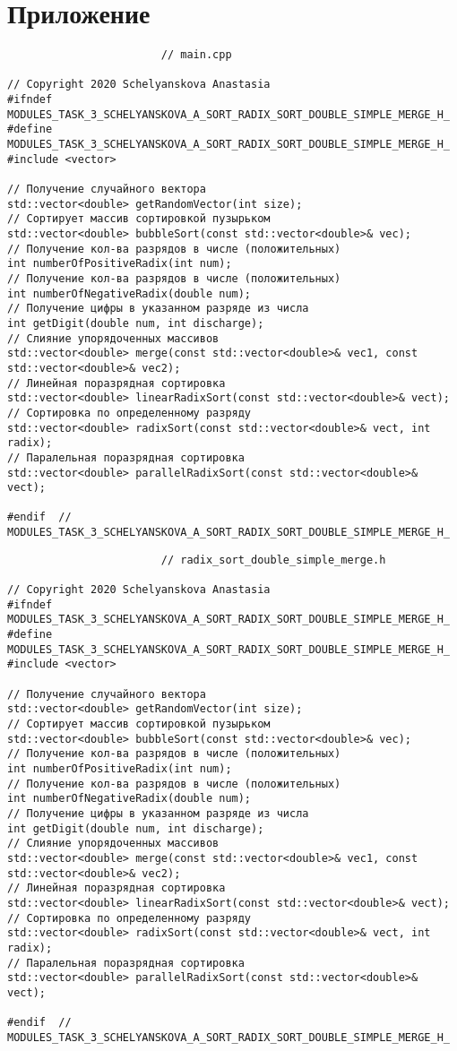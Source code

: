 \documentclass{report}
\begin{document}
\section*{Приложение}
\begin{lstlisting}
						// main.cpp

// Copyright 2020 Schelyanskova Anastasia
#ifndef MODULES_TASK_3_SCHELYANSKOVA_A_SORT_RADIX_SORT_DOUBLE_SIMPLE_MERGE_H_
#define MODULES_TASK_3_SCHELYANSKOVA_A_SORT_RADIX_SORT_DOUBLE_SIMPLE_MERGE_H_
#include <vector>

// Получение случайного вектора
std::vector<double> getRandomVector(int size);
// Сортирует массив сортировкой пузырьком
std::vector<double> bubbleSort(const std::vector<double>& vec);
// Получение кол-ва разрядов в числе (положительных)
int numberOfPositiveRadix(int num);
// Получение кол-ва разрядов в числе (положительных)
int numberOfNegativeRadix(double num);
// Получение цифры в указанном разряде из числа
int getDigit(double num, int discharge);
// Слияние упорядоченных массивов
std::vector<double> merge(const std::vector<double>& vec1, const std::vector<double>& vec2);
// Линейная поразрядная сортировка
std::vector<double> linearRadixSort(const std::vector<double>& vect);
// Сортировка по определенному разряду
std::vector<double> radixSort(const std::vector<double>& vect, int radix);
// Паралельная поразрядная сортировка
std::vector<double> parallelRadixSort(const std::vector<double>& vect);

#endif  // MODULES_TASK_3_SCHELYANSKOVA_A_SORT_RADIX_SORT_DOUBLE_SIMPLE_MERGE_H_
\end{lstlisting}
\begin{lstlisting}
						// radix_sort_double_simple_merge.h

// Copyright 2020 Schelyanskova Anastasia
#ifndef MODULES_TASK_3_SCHELYANSKOVA_A_SORT_RADIX_SORT_DOUBLE_SIMPLE_MERGE_H_
#define MODULES_TASK_3_SCHELYANSKOVA_A_SORT_RADIX_SORT_DOUBLE_SIMPLE_MERGE_H_
#include <vector>

// Получение случайного вектора
std::vector<double> getRandomVector(int size);
// Сортирует массив сортировкой пузырьком
std::vector<double> bubbleSort(const std::vector<double>& vec);
// Получение кол-ва разрядов в числе (положительных)
int numberOfPositiveRadix(int num);
// Получение кол-ва разрядов в числе (положительных)
int numberOfNegativeRadix(double num);
// Получение цифры в указанном разряде из числа
int getDigit(double num, int discharge);
// Слияние упорядоченных массивов
std::vector<double> merge(const std::vector<double>& vec1, const std::vector<double>& vec2);
// Линейная поразрядная сортировка
std::vector<double> linearRadixSort(const std::vector<double>& vect);
// Сортировка по определенному разряду
std::vector<double> radixSort(const std::vector<double>& vect, int radix);
// Паралельная поразрядная сортировка
std::vector<double> parallelRadixSort(const std::vector<double>& vect);

#endif  // MODULES_TASK_3_SCHELYANSKOVA_A_SORT_RADIX_SORT_DOUBLE_SIMPLE_MERGE_H_

\end{lstlisting}
\end{document}
